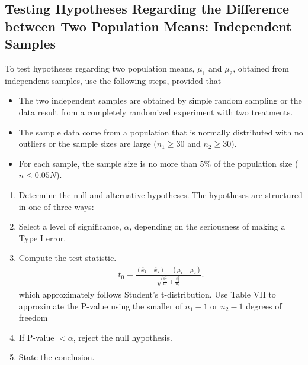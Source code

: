 \documentclass{report}
\begin{document}
    \subsection*{Testing Hypotheses Regarding the Difference between Two Population Means: Independent Samples}
    \bigbreak \noindent 
        To test hypotheses regarding two population means, $\mu_1$ and $\mu_2$, obtained from independent samples, use the following steps, provided that
    \begin{itemize}
        \item The two independent samples are obtained by simple random sampling or the data result from a completely randomized experiment with two treatments.
        \item The sample data come from a population that is normally distributed with no outliers or the sample sizes are large ($n_1 \geq 30$ and $n_2 \geq 30$).
        \item For each sample, the sample size is no more than 5\% of the population size ($n \leq 0.05N$).
    \end{itemize}
    \bigbreak \noindent 
    \begin{enumerate}
        \item Determine the null and alternative hypotheses. The hypotheses are structured in one of three ways:
        \item Select a level of significance, $\alpha $, depending on the seriousness of making a Type I error.
        \item Compute the test statistic.
            \begin{align*}
                t_{0} = \frac{(\overline{x}_{1} - \overline{x}_{2}) - (\mu_{1} - \mu_{2})}{\sqrt{\frac{s_{1}^{2}}{n_{1}} + \frac{s_{2}^{2}}{n_{2}}}}
            .\end{align*}
            which approximately follows Student's t-distribution. Use Table VII to approximate the P-value using the smaller of $n_{1} -1 $ or $n_{2} -1 $ degrees of freedom
        \item If P-value $< \alpha $, reject the null hypothesis.
        \item State the conclusion.
    \end{enumerate}

    \bigbreak \noindent \bigbreak \noindent 
\end{document}
